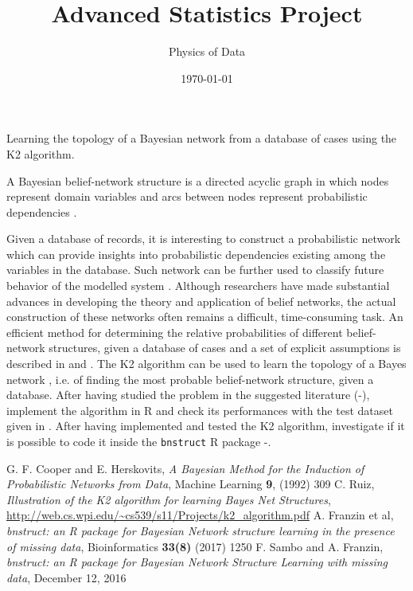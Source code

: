 \documentclass{article}
\begin{document}
\title{Advanced Statistics Project}
\author{Physics of Data}
\date{\today}
\maketitle


\begin{center}
    Learning the topology of a Bayesian network from a database of cases using the K2 algorithm. 
\end{center}

A Bayesian belief-network structure is a directed acyclic graph in which nodes represent domain variables and arcs between nodes represent probabilistic dependencies \cite{1}. 

Given a database of records, it is interesting to construct a probabilistic network which can provide insights into probabilistic dependencies existing among the variables in the database. Such network can be further used to classify future behavior of the modelled system \cite{1}. Although researchers have made substantial advances in developing the theory and application of belief networks, the actual construction of these networks often remains a difficult, time-consuming task. An efficient method for determining the relative probabilities of different belief-network structures, given a database of cases and a set of explicit assumptions is described in \cite{1} and \cite{2}. The K2 algorithm \cite{2} can be used to learn the topology of a Bayes network \cite{1}, i.e. of finding the most probable belief-network structure, given a database. After having studied the problem in the suggested literature (\cite{1}-\cite{2}), implement the algorithm in R and check its performances with the test dataset given in \cite{2}.  After having implemented and tested the K2 algorithm, investigate if it is possible to code it inside the \texttt{bnstruct} R package \cite{3}-\cite{4}.

\begin{thebibliography}{99}
 G. F. Cooper and E. Herskovits, \textit{A Bayesian Method for the Induction of Probabilistic Networks from Data}, Machine Learning \textbf{9}, (1992) 309
 C. Ruiz, \textit{Illustration of the K2 algorithm for learning Bayes Net Structures}, \url{http://web.cs.wpi.edu/~cs539/s11/Projects/k2\_algorithm.pdf}
 A. Franzin et al, \textit{bnstruct: an R package for Bayesian Network structure learning in the presence of missing data}, Bioinformatics \textbf{33(8)} (2017) 1250 
 F. Sambo and A. Franzin, \textit{bnstruct: an R package for Bayesian Network Structure Learning with missing data}, December 12, 2016
\end{thebibliography}
\end{document}
